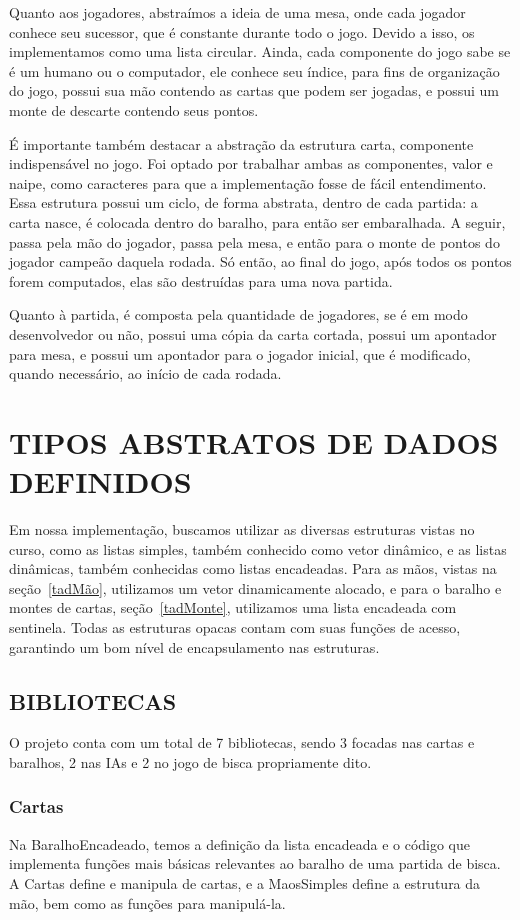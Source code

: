 \documentclass[12pt, oneside, a4paper, brazil]{abntex2}
\begin{document}
Quanto aos jogadores, abstraímos a ideia de uma mesa, onde cada jogador conhece seu sucessor, que é constante durante todo o jogo. Devido a isso, os implementamos como uma lista circular. Ainda, cada componente do jogo sabe se é um humano ou o computador, ele conhece seu índice, para fins de organização do jogo, possui sua mão contendo as cartas que podem ser jogadas, e possui um monte de descarte contendo seus pontos.

É importante também destacar a abstração da estrutura carta, componente indispensável no jogo. Foi optado por trabalhar ambas as componentes, valor e naipe, como caracteres para que a implementação fosse de fácil entendimento. Essa estrutura possui um ciclo, de forma abstrata, dentro de cada partida: a carta nasce, é colocada dentro do baralho, para então ser embaralhada. A seguir, passa pela mão do jogador, passa pela mesa, e então para o monte de pontos do jogador campeão daquela rodada. Só então, ao final do jogo, após todos os pontos forem computados, elas são destruídas para uma nova partida.

Quanto à partida, é composta pela quantidade de jogadores, se é em modo desenvolvedor ou não, possui uma cópia da carta cortada, possui um apontador para mesa, e possui um apontador para o jogador inicial, que é modificado, quando necessário, ao início de cada rodada.

\chapter{TIPOS ABSTRATOS DE DADOS DEFINIDOS}\label{cap:3}
Em nossa implementação, buscamos utilizar as diversas estruturas vistas no curso, como as listas simples, também conhecido como vetor dinâmico, e as listas dinâmicas, também conhecidas como listas encadeadas. Para as mãos, vistas na seção~\ref{tadMão}, utilizamos um vetor dinamicamente alocado, e para o baralho e montes de cartas, seção~\ref{tadMonte}, utilizamos uma lista encadeada com sentinela. Todas as estruturas opacas contam com suas funções de acesso, garantindo um bom nível de encapsulamento nas estruturas.

\section{BIBLIOTECAS}
O projeto conta com um total de 7 bibliotecas, sendo 3 focadas nas cartas e baralhos, 2 nas IAs e 2 no jogo de bisca propriamente dito.

\subsection{Cartas}
Na BaralhoEncadeado, temos a definição da lista encadeada e o código que implementa funções mais básicas relevantes ao baralho de uma partida de bisca.
A Cartas define e manipula de cartas, e a MaosSimples define a estrutura da mão, bem como as funções para manipulá-la.
\end{document}
